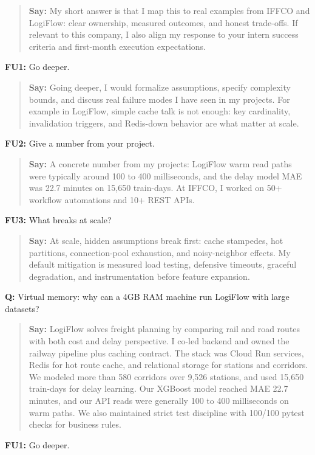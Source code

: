 \documentclass[9pt,a4paper]{article}
\begin{document}
\begin{quote}\small\textbf{Say:} My short answer is that I map this to real examples from IFFCO and LogiFlow: clear ownership, measured outcomes, and honest trade-offs. If relevant to this company, I also align my response to your intern success criteria and first-month execution expectations.\end{quote}
\vspace{2mm}
\textbf{FU1:} Go deeper.

\begin{quote}\small\textbf{Say:} Going deeper, I would formalize assumptions, specify complexity bounds, and discuss real failure modes I have seen in my projects. For example in LogiFlow, simple cache talk is not enough: key cardinality, invalidation triggers, and Redis-down behavior are what matter at scale.\end{quote}
\vspace{2mm}
\textbf{FU2:} Give a number from your project.

\begin{quote}\small\textbf{Say:} A concrete number from my projects: LogiFlow warm read paths were typically around 100 to 400 milliseconds, and the delay model MAE was 22.7 minutes on 15,650 train-days. At IFFCO, I worked on 50+ workflow automations and 10+ REST APIs.\end{quote}
\vspace{2mm}
\textbf{FU3:} What breaks at scale?

\begin{quote}\small\textbf{Say:} At scale, hidden assumptions break first: cache stampedes, hot partitions, connection-pool exhaustion, and noisy-neighbor effects. My default mitigation is measured load testing, defensive timeouts, graceful degradation, and instrumentation before feature expansion.\end{quote}
\vspace{2mm}
\textbf{Q:} Virtual memory: why can a 4GB RAM machine run LogiFlow with large datasets?

\begin{quote}\small\textbf{Say:} LogiFlow solves freight planning by comparing rail and road routes with both cost and delay perspective. I co-led backend and owned the railway pipeline plus caching contract. The stack was Cloud Run services, Redis for hot route cache, and relational storage for stations and corridors. We modeled more than 580 corridors over 9,526 stations, and used 15,650 train-days for delay learning. Our XGBoost model reached MAE 22.7 minutes, and our API reads were generally 100 to 400 milliseconds on warm paths. We also maintained strict test discipline with 100/100 pytest checks for business rules.\end{quote}
\vspace{2mm}
\textbf{FU1:} Go deeper.
\end{document}
